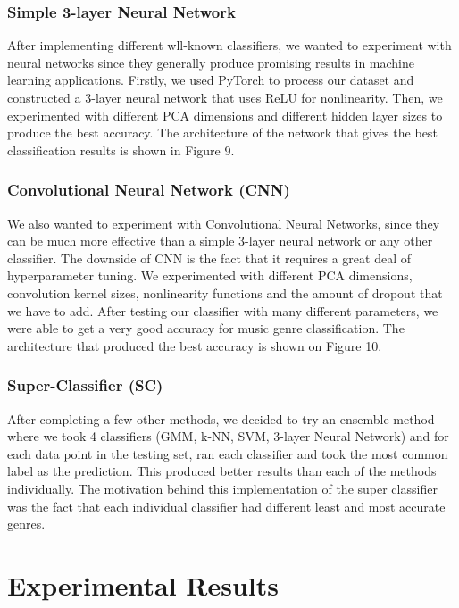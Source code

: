 \subsubsection{\textbf{Simple 3-layer Neural Network}}
After implementing different wll-known classifiers, we wanted to experiment with neural networks since they generally produce promising results in machine learning applications. Firstly, we used PyTorch to process our dataset and constructed a 3-layer neural network that uses ReLU for nonlinearity. Then, we experimented with different PCA dimensions and different hidden layer sizes to produce the best accuracy. The architecture of the network that gives the best classification results is shown in Figure 9. 


\subsubsection{\textbf{Convolutional Neural Network (CNN)}}
We also wanted to experiment with Convolutional Neural Networks, since they can be much more effective than a simple 3-layer neural network or any other classifier. The downside of CNN is the fact that it requires a great deal of hyperparameter tuning. We experimented with different PCA dimensions, convolution kernel sizes, nonlinearity functions and the amount of dropout that we have to add. After testing our classifier with many different parameters, we were able to get a very good accuracy for music genre classification. The architecture that produced the best accuracy is shown on Figure 10. 

\subsubsection{\textbf{Super-Classifier (SC)}}
After completing a few other methods, we decided to try an ensemble method where we took 4 classifiers (GMM, k-NN, SVM, 3-layer Neural Network) and for each data point in the testing set, ran each classifier and took the most common label as the prediction. This produced better results than each of the methods individually. The motivation behind this implementation of the super classifier was the fact that each individual classifier had different least and most accurate genres. 

\section{Experimental Results}\label{sec:results}

